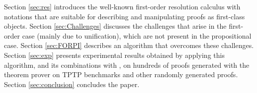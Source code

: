 Section \ref{sec:res} introduces the well-known first-order resolution calculus with notations that are suitable for describing and manipulating proofs as first-class objects. Section \ref{sec:Challenges} discusses the challenges that arise in the first-order case (mainly due to unification), which are not present in the propositional case. Section \ref{sec:FORPI} describes an algorithm that overcomes these challenges. Section \ref{sec:exp} presents experimental results obtained by applying this algorithm, and its combinations with {\GFOLU}, on hundreds of proofs generated with the {\SPASS} theorem prover on TPTP benchmarks \cite{TPTP} and other randomly generated proofs. Section \ref{sec:conclusion} concludes the paper.
